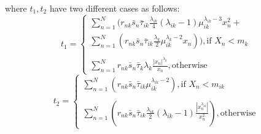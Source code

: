 \documentclass[letterpaper]{article}
\begin{document}



where $t_1, t_2 $ have two different cases as follows:
\[
    t_1= 
\begin{cases}
    \sum_{{n=1}}^{N}(r_{nk}\bar{s}_n\bar{\tau}_{ik}\frac{\lambda_{ik}}{4}(\lambda_{ik}-1)\mu_{ik}^{\lambda_{ik}-3} x_n^2 + \\ 
        \sum_{{n=1}}^{N}(r_{nk}\bar{s}_n\bar{\tau}_{ik}\frac{\lambda_k}{2}\mu_{ik}^{\lambda_k-2}x_n))     , \text{if } X_n < m_k&\\ \\
        \sum_{n=1}^{N}r_{nk}\bar{s}_n\bar{\tau}_k\lambda_k\frac{|x_n|^{\lambda_k}}{x_n},              \text{otherwise}&
\end{cases}
\]
\[
        t_2= 
    \begin{cases}
        \sum_{{n=1}}^{N}(r_{nk}\bar{s}_n\bar{\tau}_{ik}\mu_{ik}^{\lambda_{ik}-2}),\text{if } X_n < m_{ik}&\\ \\
        \sum_{{n=1}}^{N}(r_{nk}\bar{s}_n\bar{\tau}_{ik}\frac{\lambda_{ik}}{2}(\lambda_{ik}-1)\frac{|x_n^{\lambda_{ik}}|}{x_n^2}),               \text{otherwise}
    \end{cases}
    \]
\end{document}
